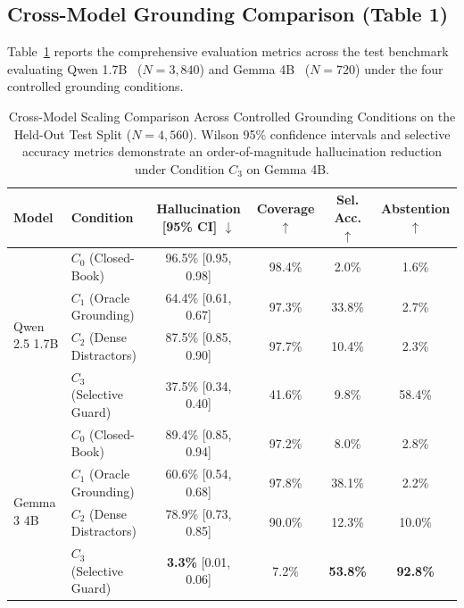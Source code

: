 \documentclass[11pt,a4paper,twocolumn]{article}
\begin{document}
\subsection{Cross-Model Grounding Comparison (Table 1)}
Table~\ref{tab:model_scaling_comparison} reports the comprehensive evaluation metrics across the test benchmark evaluating Qwen 1.7B~\citep{qwen2024qwen} ($N=3,840$) and Gemma 4B~\citep{team2024gemma} ($N=720$) under the four controlled grounding conditions.

\begin{table}[t]
\centering
\small
\setlength{\tabcolsep}{4.5pt}
\begin{tabular}{llcccc}
\toprule
\textbf{Model} & \textbf{Condition} & \textbf{Hallucination [95\% CI] $\downarrow$} & \textbf{Coverage $\uparrow$} & \textbf{Sel. Acc. $\uparrow$} & \textbf{Abstention $\uparrow$} \\
\midrule
\multirow{4}{*}{Qwen 2.5 1.7B}
& $C_0$ (Closed-Book)       & 96.5\% [0.95, 0.98] & 98.4\% & \phantom{0}2.0\% & \phantom{0}1.6\% \\
& $C_1$ (Oracle Grounding)  & 64.4\% [0.61, 0.67] & 97.3\% & 33.8\%           & \phantom{0}2.7\% \\
& $C_2$ (Dense Distractors) & 87.5\% [0.85, 0.90] & 97.7\% & 10.4\%           & \phantom{0}2.3\% \\
& $C_3$ (Selective Guard)   & 37.5\% [0.34, 0.40] & 41.6\% & \phantom{0}9.8\% & 58.4\% \\
\midrule
\multirow{4}{*}{Gemma 3 4B}
& $C_0$ (Closed-Book)       & 89.4\% [0.85, 0.94] & 97.2\% & \phantom{0}8.0\% & \phantom{0}2.8\% \\
& $C_1$ (Oracle Grounding)  & 60.6\% [0.54, 0.68] & 97.8\% & 38.1\%           & \phantom{0}2.2\% \\
& $C_2$ (Dense Distractors) & 78.9\% [0.73, 0.85] & 90.0\% & 12.3\%           & 10.0\% \\
& $C_3$ (Selective Guard)   & \textbf{3.3\%} [0.01, 0.06] & \phantom{0}7.2\% & \textbf{53.8\%} & \textbf{92.8\%} \\
\bottomrule
\end{tabular}
\caption{Cross-Model Scaling Comparison Across Controlled Grounding Conditions on the Held-Out Test Split ($N=4{,}560$). Wilson 95\% confidence intervals and selective accuracy metrics demonstrate an order-of-magnitude hallucination reduction under Condition $C_3$ on Gemma 4B.}
\label{tab:model_scaling_comparison}
\end{table}
\end{document}

